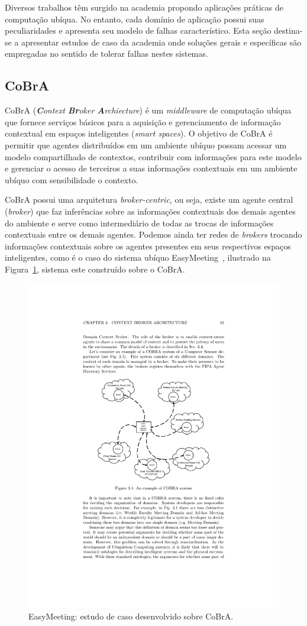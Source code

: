 Diversos trabalhos têm surgido na academia propondo aplicações práticas de computação ubíqua. No entanto, cada domínio de aplicação possui suas peculiaridades e apresenta seu modelo de falhas característico. Esta seção destina-se a apresentar estudos de caso da academia onde soluções gerais e específicas são empregadas no sentido de tolerar falhas nestes sistemas.

\subsection{CoBrA} %
\label{sub:cobra}

CoBrA (\emph{\textbf{C}ontext \textbf{Br}oker \textbf{A}rchiecture}) é um \emph{middleware} de computação ubíqua que fornece serviços básicos para a aquisição e gerenciamento de informação contextual em espaços inteligentes (\emph{smart spaces}). O objetivo de CoBrA é permitir que agentes distribuídos em um ambiente ubíquo possam acessar um modelo compartilhado de contextos, contribuir com informações para este modelo e gerenciar o acesso de terceiros a suas informações contextuais em um ambiente ubíquo com sensibilidade o contexto.

CoBrA possui uma arquitetura \emph{broker-centric}, ou seja, existe um agente central (\emph{broker}) que faz inferências sobre as informações contextuais dos demais agentes do ambiente e serve como intermediário de todas as trocas de informações contextuais entre os demais agentes. Podemos ainda ter redes de \emph{brokers} trocando informações contextuais sobre os agentes presentes em seus respectivos espaços inteligentes, como é o caso do sistema ubíquo EasyMeeting~\cite{finin2005semantic}, ilustrado na Figura~\ref{fig:_cobra_easy_meeting}, sistema este construído sobre o CoBrA.

\begin{figure}[htbp]
	\centering
		\includegraphics[width=.7\textwidth]{figuras/cobra_easy_meeting.pdf}
	\caption{EasyMeeting: estudo de caso desenvolvido sobre CoBrA.}
	\label{fig:_cobra_easy_meeting}
\end{figure}

